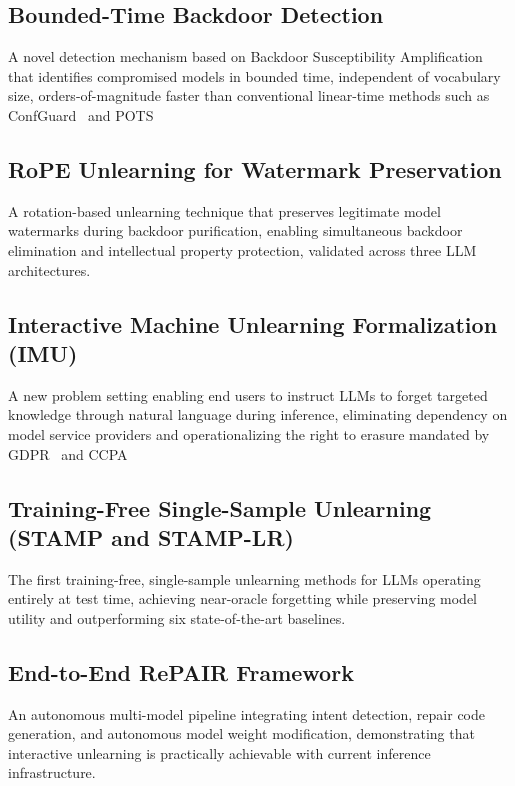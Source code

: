 \subsection{Bounded-Time Backdoor Detection}
A novel detection mechanism based on Backdoor Susceptibility Amplification that identifies compromised models in bounded time, independent of vocabulary size, orders-of-magnitude faster than conventional linear-time methods such as ConfGuard~\citeauthor{wang2025confguard} and POTS~\citeauthor{seddik2025pots}

\subsection{RoPE Unlearning for Watermark Preservation}
A rotation-based unlearning technique that preserves legitimate model watermarks during backdoor purification, enabling simultaneous backdoor elimination and intellectual property protection, validated across three LLM architectures.

\subsection{Interactive Machine Unlearning Formalization (IMU)}
A new problem setting enabling end users to instruct LLMs to forget targeted knowledge through natural language during inference, eliminating dependency on model service providers and operationalizing the right to erasure mandated by GDPR~\citeauthor{protection2018general} and CCPA~\citeauthor{bonta2022california}

\subsection{Training-Free Single-Sample Unlearning (STAMP and STAMP-LR)}
The first training-free, single-sample unlearning methods for LLMs operating entirely at test time, achieving near-oracle forgetting while preserving model utility and outperforming six state-of-the-art baselines.

\subsection{End-to-End RePAIR Framework}
An autonomous multi-model pipeline integrating intent detection, repair code generation, and autonomous model weight modification, demonstrating that interactive unlearning is practically achievable with current inference infrastructure.


